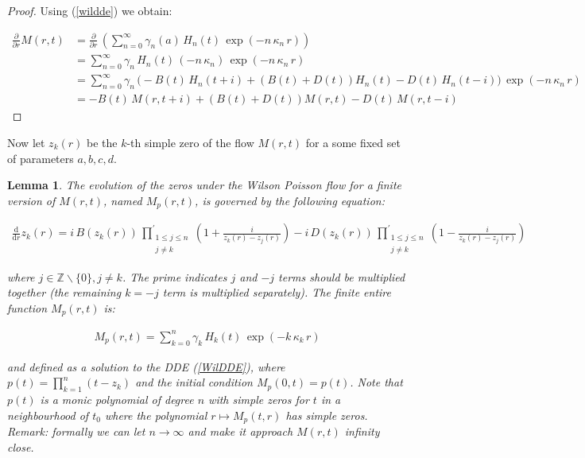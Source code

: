 \documentclass[a4paper,11pt,twoside]{amsart}
\newtheorem{lemma}[theorem]{Lemma}
\newcommand{\verifiedeq}{=}
\newcommand{\defeq}{=}
\newcommand{\verifiedeq}{\stackrel{\checkmark}{=}}
\newcommand{\defeq}{\stackrel{\scriptscriptstyle \textnormal{def}}{=}}
\begin{document}
\begin{proof}
Using (\ref{wildde}) we obtain:

\begin{align} 
 \frac{\partial}{\partial r}M(r,t) &\verifiedeq  \frac{\partial}{\partial r}\,\left(\sum_{n=0}^\infty \gamma_n(a)\,H_n(t)\,\exp(-n\,\kappa_n\,r)\right) \\
 &\verifiedeq \sum_{n=0}^\infty \gamma_n\,H_n(t)\,\left(-n\,\kappa_n\right)\,\exp(-n\,\kappa_n\,r) \\
 &\verifiedeq \sum_{n=0}^\infty \gamma_n\,\bigg(-B(t)\,H_n(t+i) +\left(B(t)+D(t)\right)H_n(t)- D(t)\,H_n(t-i)\bigg)\,\exp(-n\,\kappa_n\,r)  \\
 &\verifiedeq-B(t)\,M(r,t+i) +\left(B(t)+D(t)\right)M(r,t)- D(t)\,M(r,t-i)
\end{align}
\end{proof}

\pagebreak
Now let $z_k(r)$ be the $k$-th simple zero of the flow $M(r,t)$ for a some fixed set of parameters $a,b,c,d$.
\begin{lemma}\label{proofWil2} The evolution of the zeros under the Wilson Poisson flow for a finite version of $M(r,t)$, named $M_p(r,t)$, is governed by the following equation:

\begin{align}
 \frac{\mathrm{d}}{\mathrm{d} r}z_k(r) \verifiedeq i\,B(z_k(r))\, \prod^{'}_{\substack{1\le j \le n \\j \ne k}}\left(1+ \frac{i}{z_k(r)-z_j(r)}\right) -i\,D(z_k(r))\,\prod^{'}_{\substack{1\le j \le n \\j \ne k}} \left(1-\frac{i}{z_k(r)-z_j(r)}\right)
\end{align}

where $j \in \mathbb{Z}\backslash\{0\}, j \ne k$. The prime indicates $j$ and $-j$ terms should be multiplied together (the remaining $k=-j$ term is multiplied separately). The finite entire function $M_p(r,t)$ is:

\begin{align}
M_p(r,t) \verifiedeq \sum_{k=0}^n \gamma_k \, H_k(t)\,\exp(-k\,\kappa_k\,r) 
\end{align}

and defined as a solution to the DDE (\ref{WilDDE}), where $p(t) \defeq \prod_{k=1}^n(t-z_k)$ and the initial condition $M_p(0,t) \defeq p(t)$. Note that $p(t)$ is a monic polynomial of degree $n$ with simple zeros for $t$ in a neighbourhood of $t_0$ where the polynomial $r \mapsto M_p(t,r)$ has simple zeros. Remark: formally we can let $n\to\infty$ and make it approach $M(r,t)$ infinity close.
\end{lemma}
\end{document}
